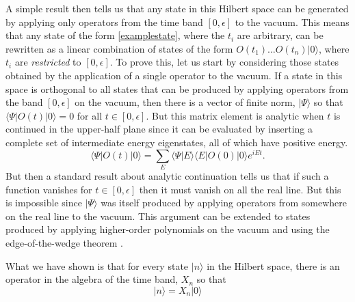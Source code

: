 \documentclass[12pt]{article}
\newcommand{\be}{\begin{equation}}
\newcommand{\ee}{\end{equation}}
\begin{document}
A simple result \cite{Banerjee:2016mhh} then tells us that any state in this Hilbert space can be generated by applying only operators from the time band $[0, \epsilon]$ to the vacuum.  This means that any state of the form \eqref{examplestate}, where the $t_i$ are arbitrary, can be rewritten as a linear combination of states of the form  $O(t_1) \ldots O(t_n) | 0 \rangle$, where $t_i$ are {\em restricted} to $[0, \epsilon]$.
To prove this, let us start by considering those states obtained by the application of a single operator to the vacuum. If a state in this space is orthogonal to all states that can be produced by applying operators from the band $[0,\epsilon]$ on the vacuum, then there is a vector of finite norm, $|\Psi \rangle$ so that $\langle \Psi | O(t) | 0 \rangle = 0$ for all $t \in [0, \epsilon]$. But this matrix element is analytic when $t$ is continued in the upper-half plane since it can be evaluated by inserting a complete set of intermediate energy eigenstates, all of which have positive energy.
\be
\langle \Psi | O(t) | 0 \rangle = \sum_{E} \langle \Psi | E \rangle \langle E| O(0) | 0 \rangle e^{i E t}.
\ee
But then a standard result about analytic continuation tells us that if such a function vanishes for $t \in [0, \epsilon]$ then it must vanish on all the real line. But this is impossible since $|\Psi \rangle$ was itself produced by applying operators from somewhere on the real line to the vacuum. This argument can be extended to states produced by applying higher-order polynomials on the vacuum and using the edge-of-the-wedge theorem \cite{streater2016pct}.

What we have shown is that for every state $|n \rangle$ in the Hilbert space, there is an operator in the algebra of the time band, $X_n$ so that
\be
\label{rs}
|n \rangle = X_n |0 \rangle
\ee
\end{document}

